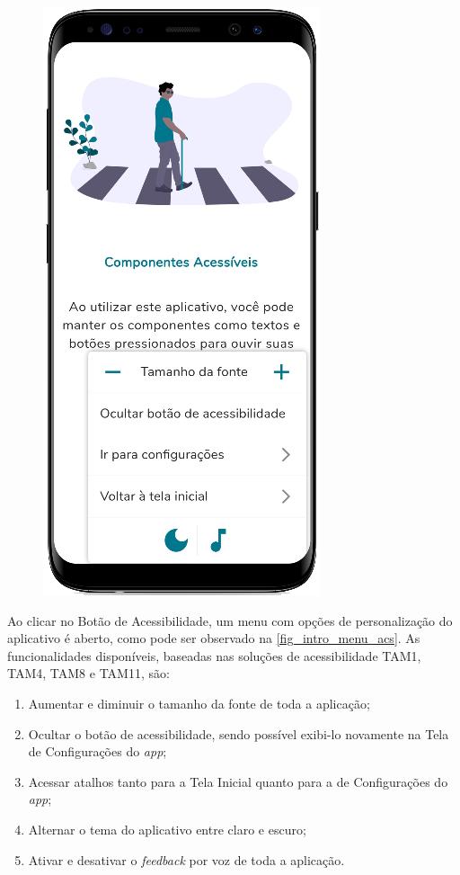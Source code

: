 \begin{figure}[htb]
\begin{minipage}{0.45\textwidth}
        \includegraphics[scale=0.63]{Imagens/desenvolvimento/app/intro_menu_acs.png}
    \end{minipage}
\end{figure}

Ao clicar no Botão de Acessibilidade, um menu com opções de personalização do aplicativo é aberto,
como pode ser observado na \autoref{fig_intro_menu_acs}. As funcionalidades disponíveis, baseadas nas
soluções de acessibilidade TAM1, TAM4, TAM8 e TAM11, são:

\begin{enumerate}
    \item Aumentar e diminuir o tamanho da fonte de toda a aplicação;
    \item Ocultar o botão de acessibilidade, sendo possível exibi-lo novamente na Tela de Configurações do \emph{app};
    \item Acessar atalhos tanto para a Tela Inicial quanto para a de Configurações do \emph{app};
    \item Alternar o tema do aplicativo entre claro e escuro;
    \item Ativar e desativar o \emph{feedback} por voz de toda a aplicação.
\end{enumerate}

